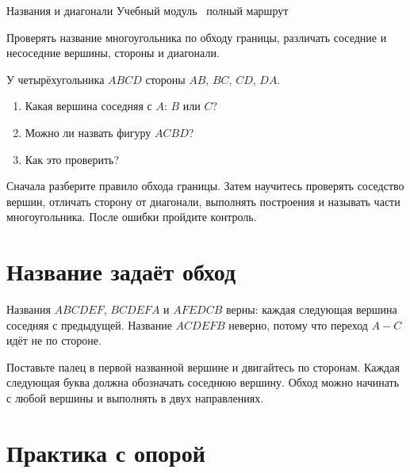 \worksheettitle
  {Названия и диагонали}
  { Учебный модуль \textbullet\ полный маршрут}

\studentnameblock

\begin{notebox}
  Проверять название многоугольника по обходу границы, различать соседние и
  несоседние вершины, стороны и диагонали.
\end{notebox}

\begin{checkpointbox}
  У четырёхугольника $ABCD$ стороны $AB$, $BC$, $CD$, $DA$.
  \begin{enumerate}[label=\textbf{\arabic*.}]
    \item Какая вершина соседняя с $A$: $B$ или $C$? \answerblank[15mm]
    \item Можно ли назвать фигуру $ACBD$? \answerblank[20mm]
    \item Как это проверить? \answerblank[65mm]
  \end{enumerate}
\end{checkpointbox}

\begin{notebox}
  Сначала разберите правило обхода границы. Затем научитесь проверять
  соседство вершин, отличать сторону от диагонали, выполнять построения и
  называть части многоугольника. После ошибки пройдите контроль.
\end{notebox}

\section{Название задаёт обход}

\correctnamingfigure

\begin{fillbox}
  Названия $ABCDEF$, $BCDEFA$ и $AFEDCB$ верны: каждая следующая вершина
  соседняя с предыдущей. Название $ACDEFB$ неверно, потому что переход
  $A-C$ идёт не по стороне.
\end{fillbox}

\begin{notebox}
  Поставьте палец в первой названной вершине и двигайтесь по сторонам.
  Каждая следующая буква должна обозначать соседнюю вершину. Обход можно
  начинать с любой вершины и выполнять в двух направлениях.
\end{notebox}

\section{Практика с опорой}

